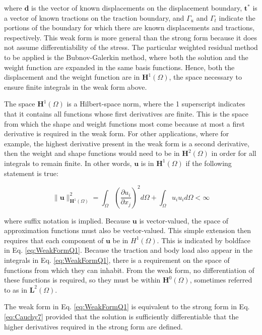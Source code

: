 \documentclass[10pt]{article}
\begin{document}
where \(\textbf{d}\) is the vector of known displacements on the displacement boundary, \(\textbf{t}^{*}\) is a vector of known tractions on the traction boundary, and \(\Gamma_u\)  and \(\Gamma_t\) indicate the portions of the boundary for which there are known displacements and tractions, respectively. This weak form is more general than the strong form because it does not assume differentiability of the stress. The particular weighted residual method to be applied is the Bubnov-Galerkin method, where both the solution and the weight function are expanded in the same basis functions. Hence, both the displacement and the weight function are in \(\textbf{H}^1(\Omega)\), the space necessary to ensure finite integrals in the weak form above. 

The space \(\textbf{H}^1(\Omega)\) is a Hilbert-space norm, where the 1 superscript indicates that it contains all functions whose first derivatives are finite. This is the space from which the shape and weight functions most come because at most a first derivative is required in the weak form. For other applications, where for example, the highest derivative present in the weak form is a second derivative, then the weight and shape functions would need to be in \(\textbf{H}^2(\Omega)\) in order for all integrals to remain finite. In other words, \(\textbf{u}\) is in \(\textbf{H}^1(\Omega)\) if the following statement is true:

\begin{equation}
\|\textbf{u}\|^2_{\textbf{H}^1(\Omega)}=\int_{\Omega}\left(\frac{\partial u_i}{\partial x_j}\right)^2d\Omega+\int_{\Omega}u_iu_id\Omega<\infty
\end{equation}

where suffix notation is implied. Because \(\textbf{u}\) is vector-valued, the space of approximation functions must also be vector-valued. This simple extension then requires that each component of \(\textbf{u}\) be in \(H^1(\Omega)\). This is indicated by boldface in Eq. \eqref{eq:WeakFormQ1}. Because the traction and body load also appear in the integrals in Eq. \eqref{eq:WeakFormQ1}, there is a requirement on the space of functions from which they can inhabit. From the weak form, no differentiation of these functions is required, so they must be within \(\textbf{H}^0(\Omega)\), sometimes referred to as in \(\textbf{L}^2(\Omega)\). 

The weak form in Eq. \eqref{eq:WeakFormQ1} is equivalent to the strong form in Eq. \eqref{eq:Cauchy7} provided that the solution is sufficiently differentiable that the higher derivatives required in the strong form are defined.
\end{document}
